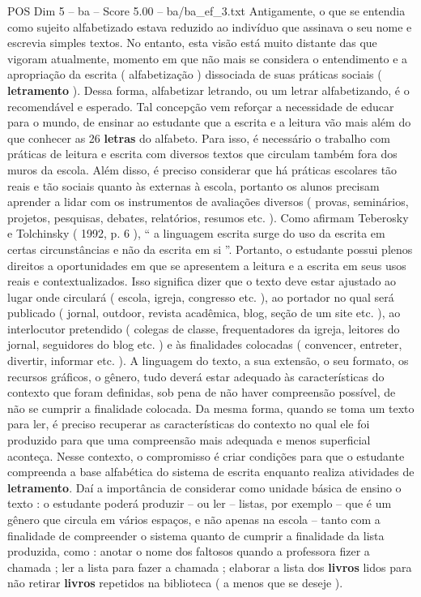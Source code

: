 \begin{textsample}{POS Dim 5 – ba – Score 5.00 – ba/ba\_ef\_3.txt}
Antigamente, o que se entendia como sujeito alfabetizado estava reduzido ao indivíduo que assinava o seu nome e escrevia simples textos.
No entanto, esta visão está muito distante das que vigoram atualmente, momento em que não mais se considera o entendimento e a apropriação da escrita ( alfabetização ) dissociada de suas práticas sociais ( \textbf{letramento} ).
Dessa forma, alfabetizar letrando, ou um letrar alfabetizando, é o recomendável e esperado.
Tal concepção vem reforçar a necessidade de educar para o mundo, de ensinar ao estudante que a escrita e a leitura vão mais além do que conhecer as 26 \textbf{letras} do alfabeto.
Para isso, é necessário o trabalho com práticas de leitura e escrita com diversos textos que circulam também fora dos muros da escola.
Além disso, é preciso considerar que há práticas escolares tão reais e tão sociais quanto às externas à escola, portanto os alunos precisam aprender a lidar com os instrumentos de avaliações diversos ( provas, seminários, projetos, pesquisas, debates, relatórios, resumos etc. ).
Como afirmam Teberosky e Tolchinsky ( 1992, p. 6 ), “ a linguagem escrita surge do uso da escrita em certas circunstâncias e não da escrita em si ”.
Portanto, o estudante possui plenos direitos a oportunidades em que se apresentem a leitura e a escrita em seus usos reais e contextualizados.
Isso significa dizer que o texto deve estar ajustado ao lugar onde circulará ( escola, igreja, congresso etc. ), ao portador no qual será publicado ( jornal, outdoor, revista acadêmica, blog, seção de um site etc. ), ao interlocutor pretendido ( colegas de classe, frequentadores da igreja, leitores do jornal, seguidores do blog etc. ) e às finalidades colocadas ( convencer, entreter, divertir, informar etc. ).
A linguagem do texto, a sua extensão, o seu formato, os recursos gráficos, o gênero, tudo deverá estar adequado às características do contexto que foram definidas, sob pena de não haver compreensão possível, de não se cumprir a finalidade colocada.
Da mesma forma, quando se toma um texto para ler, é preciso recuperar as características do contexto no qual ele foi produzido para que uma compreensão mais adequada e menos superficial aconteça.
Nesse contexto, o compromisso é criar condições para que o estudante compreenda a base alfabética do sistema de escrita enquanto realiza atividades de \textbf{letramento}.
Daí a importância de considerar como unidade básica de ensino o texto : o estudante poderá produzir – ou ler – listas, por exemplo – que é um gênero que circula em vários espaços, e não apenas na escola – tanto com a finalidade de compreender o sistema quanto de cumprir a finalidade da lista produzida, como : anotar o nome dos faltosos quando a professora fizer a chamada ; ler a lista para fazer a chamada ; elaborar a lista dos \textbf{livros} lidos para não retirar \textbf{livros} repetidos na biblioteca ( a menos que se deseje ).

\end{textsample}
